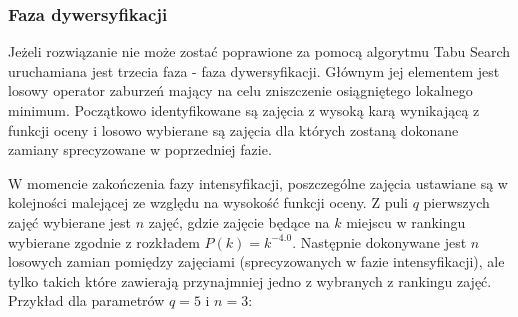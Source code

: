 \subsubsection{Faza dywersyfikacji}
\par Jeżeli rozwiązanie nie może zostać poprawione za pomocą algorytmu Tabu Search uruchamiana jest trzecia faza - faza dywersyfikacji. Głównym jej elementem jest losowy operator zaburzeń mający na celu zniszczenie osiągniętego lokalnego minimum. Początkowo identyfikowane są zajęcia z wysoką karą wynikającą z funkcji oceny  i losowo wybierane są zajęcia dla których zostaną dokonane zamiany sprecyzowane w poprzedniej fazie.
\par W momencie zakończenia fazy intensyfikacji, poszczególne zajęcia ustawiane są w kolejności malejącej ze względu na wysokość funkcji oceny. Z puli $q$ pierwszych zajęć wybierane jest $n$ zajęć, gdzie zajęcie będące na $k$ miejscu w rankingu wybierane zgodnie z rozkładem $P(k) = k^{-4.0}$. Następnie dokonywane jest $n$ losowych zamian pomiędzy zajęciami (sprecyzowanych w fazie intensyfikacji), ale tylko takich które zawierają przynajmniej jedno z wybranych z rankingu zajęć. \\
Przykład dla parametrów $q = 5$ i $n = 3$:
